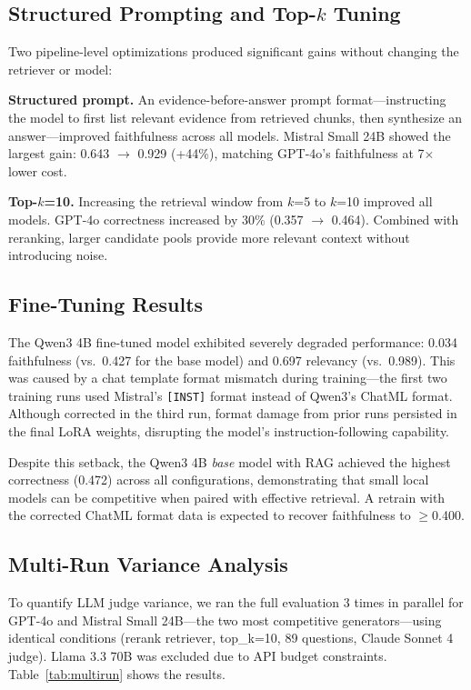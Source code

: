 \documentclass{article}
\begin{document}
\subsection{Structured Prompting and Top-$k$ Tuning}
\label{sec:structured_prompt}

Two pipeline-level optimizations produced significant gains without changing the retriever or model:

\textbf{Structured prompt.} An evidence-before-answer prompt format---instructing the model to first list relevant evidence from retrieved chunks, then synthesize an answer---improved faithfulness across all models. Mistral Small 24B showed the largest gain: 0.643 $\rightarrow$ 0.929 (+44\%), matching GPT-4o's faithfulness at 7$\times$ lower cost.

\textbf{Top-$k$=10.} Increasing the retrieval window from $k$=5 to $k$=10 improved all models. GPT-4o correctness increased by 30\% (0.357 $\rightarrow$ 0.464). Combined with reranking, larger candidate pools provide more relevant context without introducing noise.

\subsection{Fine-Tuning Results}
\label{sec:finetuning_results}

The Qwen3 4B fine-tuned model exhibited severely degraded performance: 0.034 faithfulness (vs.\ 0.427 for the base model) and 0.697 relevancy (vs.\ 0.989). This was caused by a chat template format mismatch during training---the first two training runs used Mistral's \texttt{[INST]} format instead of Qwen3's ChatML format. Although corrected in the third run, format damage from prior runs persisted in the final LoRA weights, disrupting the model's instruction-following capability.

Despite this setback, the Qwen3 4B \emph{base} model with RAG achieved the highest correctness (0.472) across all configurations, demonstrating that small local models can be competitive when paired with effective retrieval. A retrain with the corrected ChatML format data is expected to recover faithfulness to $\geq$0.400.

\subsection{Multi-Run Variance Analysis}

To quantify LLM judge variance, we ran the full evaluation 3 times in parallel for GPT-4o and Mistral Small 24B---the two most competitive generators---using identical conditions (rerank retriever, top\_k=10, 89 questions, Claude Sonnet 4 judge). Llama 3.3 70B was excluded due to API budget constraints. Table~\ref{tab:multirun} shows the results.
\end{document}
